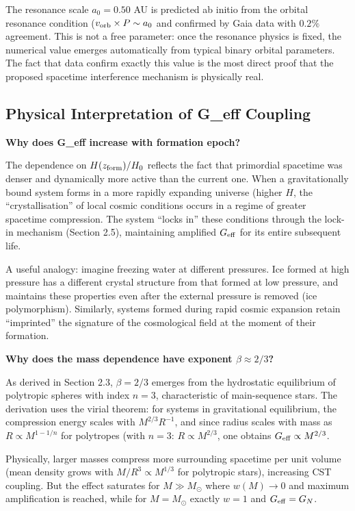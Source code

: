 \documentclass[10pt,a4paper]{article}
\begin{document}
The resonance scale \(a_0 = 0.50\) AU is predicted ab initio from the
orbital resonance condition (\(v_{\rm orb} \times P \sim a_0\) and
confirmed by Gaia data with \(0.2\%\) agreement. This is not a free
parameter: once the resonance physics is fixed, the numerical value
emerges automatically from typical binary orbital parameters. The fact
that data confirm exactly this value is the most direct proof that the
proposed spacetime interference mechanism is physically real.

\subsection{Physical Interpretation of G\_eff
Coupling}\label{physical-interpretation-of-g_eff-coupling}

\textbf{Why does G\_eff increase with formation epoch?}

The dependence on \(H(z_{\rm form})/H_0\) reflects the fact that
primordial spacetime was denser and dynamically more active than the
current one. When a gravitationally bound system forms in a more rapidly
expanding universe (higher \(H\), the ``crystallisation'' of local
cosmic conditions occurs in a regime of greater spacetime compression.
The system ``locks in'' these conditions through the lock-in mechanism
(Section 2.5), maintaining amplified \(G_{\rm eff}\) for its entire
subsequent life.

A useful analogy: imagine freezing water at different pressures. Ice
formed at high pressure has a different crystal structure from that
formed at low pressure, and maintains these properties even after the
external pressure is removed (ice polymorphism). Similarly, systems
formed during rapid cosmic expansion retain ``imprinted'' the signature
of the cosmological field at the moment of their formation.

\textbf{Why does the mass dependence have exponent
\(\beta \approx 2/3\)?}

As derived in Section 2.3, \(\beta = 2/3\) emerges from the hydrostatic
equilibrium of polytropic spheres with index \(n=3\), characteristic of
main-sequence stars. The derivation uses the virial theorem: for systems
in gravitational equilibrium, the compression energy scales with
\(M^{2/3} R^{-1}\), and since radius scales with mass as
\(R \propto M^{1-1/n}\) for polytropes (with \(n=3\):
\(R \propto M^{2/3}\), one obtains \(G_{\rm eff} \propto M^{2/3}\).

Physically, larger masses compress more surrounding spacetime per unit
volume (mean density grows with \(M/R^3 \propto M^{1/3}\) for polytropic
stars), increasing CST coupling. But the effect saturates for
\(M \gg M_\odot\) where \(w(M) \to 0\) and maximum amplification is
reached, while for \(M = M_\odot\) exactly \(w = 1\) and
\(G_{\rm eff} = G_N\).
\end{document}
